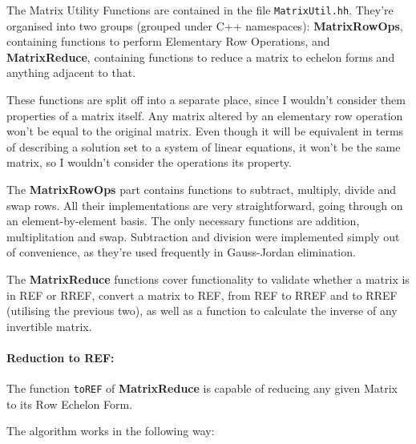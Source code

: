 \documentclass[11pt, a4paper]{article}
\begin{document}
The Matrix Utility Functions are contained in the file \texttt{MatrixUtil.hh}. They're organised into two groups (grouped under C++ namespaces): \textbf{MatrixRowOps}, containing functions to perform Elementary Row Operations, and \textbf{MatrixReduce}, containing functions to reduce a matrix to echelon forms and anything adjacent to that.

These functions are split off into a separate place, since I wouldn't consider them properties of a matrix itself. Any matrix altered by an elementary row operation won't be equal to the original matrix. Even though it will be equivalent in terms of describing a solution set to a system of linear equations, it won't be the same matrix, so I wouldn't consider the operations its property.

The \textbf{MatrixRowOps} part contains functions to subtract, multiply, divide and swap rows. All their implementations are very straightforward, going through on an element-by-element basis. The only necessary functions are addition, multiplitation and swap. Subtraction and division were implemented simply out of convenience, as they're used frequently in Gauss-Jordan elimination.

The \textbf{MatrixReduce} functions cover functionality to validate whether a matrix is in REF or RREF, convert a matrix to REF, from REF to RREF and to RREF (utilising the previous two), as well as a function to calculate the inverse of any invertible matrix.

\paragraph{Reduction to REF:}

The function \texttt{toREF} of \textbf{MatrixReduce} is capable of reducing any given Matrix to its Row Echelon Form.

The algorithm works in the following way:
\end{document}
